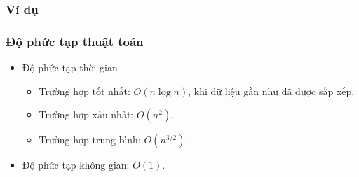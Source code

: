 \subsubsection{Ví dụ}

\subsubsection{Độ phức tạp thuật toán}

\begin{itemize}
    \item Độ phức tạp thời gian
    \begin{itemize}[label=$\circ$]
        \item Trường hợp tốt nhất: $O\left(n\log{n}\right)$, khi dữ liệu gần như đã được sắp xếp.
        \item Trường hợp xấu nhất: $O\left(n^2\right)$.
        \item Trường hợp trung bình: $O\left(n^{3/2}\right)$.
    \end{itemize}
    \item Độ phức tạp không gian: $O\left(1\right)$.
\end{itemize}